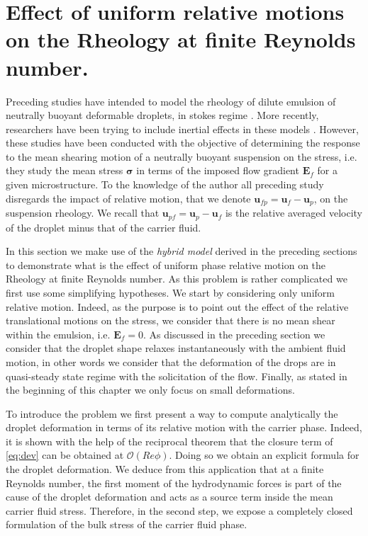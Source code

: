 \section{
    Effect of uniform relative motions on the Rheology at finite Reynolds number. 
    }
\label{sec:particle_def}


Preceding studies have intended to model the rheology of dilute emulsion of neutrally buoyant deformable droplets, in stokes regime \citep{goddard1967nonlinear,lhuillier1987phenomenology,maffettone1998equation}.
More recently, researchers have been trying to include inertial effects in these models \citet{raja2010inertial,mwasame2018macroscopic}. 
However, these studies have been conducted with the objective of determining the response to the mean shearing motion of a neutrally buoyant suspension on the stress, i.e. they study the mean stress $\bm{\sigma}$ in terms of the imposed flow gradient $\textbf{E}_f$ for a given microstructure. 
To the knowledge of the author all preceding study disregards the impact of relative motion, that we denote $\textbf{u}_{fp} = \textbf{u}_f - \textbf{u}_p$, on the suspension rheology.
We recall that $\textbf{u}_{p f} = \textbf{u}_p  - \textbf{u}_f$ is the relative averaged velocity of the droplet minus that of the carrier fluid.


In this section we make use of the \textit{hybrid model} derived in the preceding sections to demonstrate what is the effect of uniform phase relative motion on the Rheology at finite Reynolds number. 
As this problem is rather complicated we first use some simplifying hypotheses. 
We start by considering only uniform relative motion. 
Indeed, as the purpose is to point out the effect of the relative translational motions on the stress, we consider that there is no mean shear within the emulsion, i.e. $\textbf{E}_f = 0$. 
As discussed in the preceding section we consider that the droplet shape relaxes instantaneously with the ambient fluid motion, in other words we consider that the deformation of the drops are in quasi-steady state regime with the solicitation of the flow. 
Finally, as stated in the beginning of this chapter we only focus on small deformations.  



To introduce the problem we first present a way to compute analytically the droplet deformation in terms of its relative motion with the carrier phase. 
Indeed, it is shown with the help of the reciprocal theorem that the closure term of \ref{eq:dev} can be obtained at $\mathcal{O}(Re \phi)$.
Doing so we obtain an explicit formula for the droplet deformation. 
We deduce from this application that at a finite Reynolds number, the first moment of the hydrodynamic forces is  part of the cause of the droplet deformation and acts as a source term inside the mean carrier fluid stress. 
Therefore, in the second step, we expose a completely closed formulation of the bulk stress of the carrier fluid phase. 


